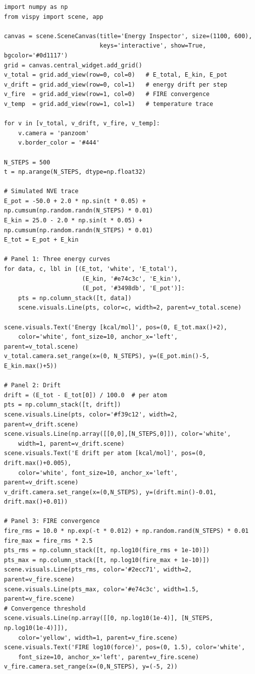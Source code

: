 \documentclass[11pt,a4paper]{article}
\begin{document}
\begin{lstlisting}[title={\textbf{Live Energy Conservation \& FIRE Convergence Monitor}}]
import numpy as np
from vispy import scene, app

canvas = scene.SceneCanvas(title='Energy Inspector', size=(1100, 600),
                           keys='interactive', show=True, bgcolor='#0d1117')
grid = canvas.central_widget.add_grid()
v_total = grid.add_view(row=0, col=0)   # E_total, E_kin, E_pot
v_drift = grid.add_view(row=0, col=1)   # energy drift per step
v_fire  = grid.add_view(row=1, col=0)   # FIRE convergence
v_temp  = grid.add_view(row=1, col=1)   # temperature trace

for v in [v_total, v_drift, v_fire, v_temp]:
    v.camera = 'panzoom'
    v.border_color = '#444'

N_STEPS = 500
t = np.arange(N_STEPS, dtype=np.float32)

# Simulated NVE trace
E_pot = -50.0 + 2.0 * np.sin(t * 0.05) + np.cumsum(np.random.randn(N_STEPS) * 0.01)
E_kin = 25.0 - 2.0 * np.sin(t * 0.05) + np.cumsum(np.random.randn(N_STEPS) * 0.01)
E_tot = E_pot + E_kin

# Panel 1: Three energy curves
for data, c, lbl in [(E_tot, 'white', 'E_total'),
                      (E_kin, '#e74c3c', 'E_kin'),
                      (E_pot, '#3498db', 'E_pot')]:
    pts = np.column_stack([t, data])
    scene.visuals.Line(pts, color=c, width=2, parent=v_total.scene)

scene.visuals.Text('Energy [kcal/mol]', pos=(0, E_tot.max()+2),
    color='white', font_size=10, anchor_x='left', parent=v_total.scene)
v_total.camera.set_range(x=(0, N_STEPS), y=(E_pot.min()-5, E_kin.max()+5))

# Panel 2: Drift
drift = (E_tot - E_tot[0]) / 100.0  # per atom
pts = np.column_stack([t, drift])
scene.visuals.Line(pts, color='#f39c12', width=2, parent=v_drift.scene)
scene.visuals.Line(np.array([[0,0],[N_STEPS,0]]), color='white',
    width=1, parent=v_drift.scene)
scene.visuals.Text('E drift per atom [kcal/mol]', pos=(0, drift.max()+0.005),
    color='white', font_size=10, anchor_x='left', parent=v_drift.scene)
v_drift.camera.set_range(x=(0,N_STEPS), y=(drift.min()-0.01, drift.max()+0.01))

# Panel 3: FIRE convergence
fire_rms = 10.0 * np.exp(-t * 0.012) + np.random.rand(N_STEPS) * 0.01
fire_max = fire_rms * 2.5
pts_rms = np.column_stack([t, np.log10(fire_rms + 1e-10)])
pts_max = np.column_stack([t, np.log10(fire_max + 1e-10)])
scene.visuals.Line(pts_rms, color='#2ecc71', width=2, parent=v_fire.scene)
scene.visuals.Line(pts_max, color='#e74c3c', width=1.5, parent=v_fire.scene)
# Convergence threshold
scene.visuals.Line(np.array([[0, np.log10(1e-4)], [N_STEPS, np.log10(1e-4)]]),
    color='yellow', width=1, parent=v_fire.scene)
scene.visuals.Text('FIRE log10(force)', pos=(0, 1.5), color='white',
    font_size=10, anchor_x='left', parent=v_fire.scene)
v_fire.camera.set_range(x=(0,N_STEPS), y=(-5, 2))


\end{lstlisting}
\end{document}
